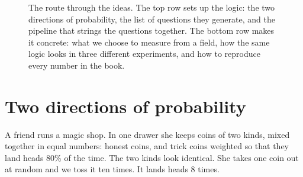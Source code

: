 \begin{figure}[htbp]
\centering
{}
\caption{The route through the ideas. The top row sets up the logic: the
two directions of probability, the list of questions they generate, and the
pipeline that strings the questions together. The bottom row makes it
concrete: what we choose to measure from a field, how the same logic looks in
three different experiments, and how to reproduce every number in the book.}
\label{0a:fig:roadmap}
\end{figure}

\section{Two directions of probability}\label{0a:sec:two-directions}

A friend runs a magic shop. In one drawer she keeps coins of two kinds, mixed
together in equal numbers: honest coins, and trick coins weighted so that they
land heads 80\% of the time. The two kinds look identical. She takes one coin
out at random and we toss it ten times. It lands heads 8 times.

